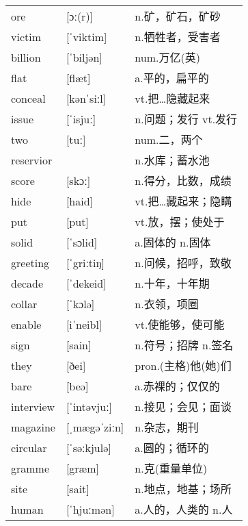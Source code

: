 \documentclass[a4paper]{article}
\begin{document}
\section{}
\begin{tabular}{l l l}

ore & [ɔː(r)] & n.矿，矿石，矿砂 \\
victim & [ˈviktim] & n.牺牲者，受害者 \\
billion & [ˈbiljən] & num.万亿(英) \\
flat & [flæt] & a.平的，扁平的 \\
conceal & [kənˈsiːl] & vt.把…隐藏起来 \\
issue & [ˈisjuː] & n.问题；发行 vt.发行 \\
two & [tuː] & num.二，两个 \\
reservior &  & n.水库；蓄水池 \\
score & [skɔː] & n.得分，比数，成绩 \\
hide & [haid] & vt.把…藏起来；隐瞒 \\
put & [put] & vt.放，摆；使处于 \\
solid & [ˈsɔlid] & a.固体的 n.固体 \\
greeting & [ˈgriːtiŋ] & n.问候，招呼，致敬 \\
decade & [ˈdekeid] & n.十年，十年期 \\
collar & [ˈkɔlə] & n.衣领，项圈 \\
enable & [iˈneibl] & vt.使能够，使可能 \\
sign & [sain] & n.符号；招牌 n.签名 \\
they & [ðei] & pron.(主格)他(她)们 \\
bare & [beə] & a.赤裸的；仅仅的 \\
interview & [ˈintəvjuː] & n.接见；会见；面谈 \\
magazine & [ˌmægəˈziːn] & n.杂志，期刊 \\
circular & [ˈsəːkjulə] & a.圆的；循环的 \\
gramme & [græm] & n.克(重量单位) \\
site & [sait] & n.地点，地基；场所 \\
human & [ˈhjuːmən] & a.人的，人类的 n.人 \\

\end{tabular}
\end{document}
